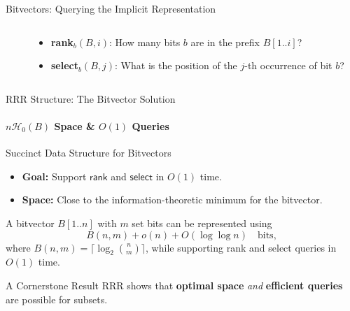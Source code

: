 \begin{frame}{Bitvectors: Querying the Implicit Representation}
    \begin{columns}[T, totalwidth=\textwidth] %
        \begin{column}{0.52\textwidth}
        \end{column}
        \begin{column}{0.45\textwidth}
            \begin{itemize}
                \item<3-> \textbf{\textsf{rank}}$_b(B, i)$: How many bits $b$ are in the prefix $B[1..i]$?
                    \pause %
                \item<5-> \textbf{\textsf{select}}$_b(B, j)$: What is the position of the $j$-th occurrence of bit $b$?
                    \pause %
            \end{itemize}
        \end{column}
    \end{columns}
\end{frame}

\begin{frame}{RRR Structure: The Bitvector Solution}
    \framesubtitle{$n\mathcal{H}_0(B)$ Space \& $O(1)$ Queries}
    \begin{block}{Succinct Data Structure for Bitvectors}
        \begin{itemize}
            \item \textbf{Goal:} Support $\textsf{rank}$ and $\textsf{select}$ in $O(1)$ time.
            \item \textbf{Space:} Close to the information-theoretic minimum for the bitvector.
        \end{itemize}
    \end{block}
    \pause
    \begin{theorem}
        A bitvector $B[1..n]$ with $m$ set bits can be represented using
        \[ B(n, m) + o(n) + O(\log \log n) \quad \text{bits}, \]
        where $B(n, m) = \lceil \log_2 \binom{n}{m} \rceil$, while supporting \textsf{rank} and \textsf{select} queries in $O(1)$ time.
    \end{theorem}
    \pause
    \begin{alertblock}{A Cornerstone Result}
        RRR shows that \textbf{optimal space} \emph{and} \textbf{efficient queries} are possible for subsets.
    \end{alertblock}
\end{frame}


